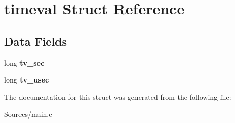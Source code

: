 \hypertarget{structtimeval}{}\section{timeval Struct Reference}
\label{structtimeval}
\subsection*{Data Fields}
\begin{DoxyCompactItemize}
\item 
long {\bfseries tv\+\_\+sec}\hypertarget{structtimeval_ad7ba4ed1f2602412d3b21ab19720fbb2}{}\label{structtimeval_ad7ba4ed1f2602412d3b21ab19720fbb2}

\item 
long {\bfseries tv\+\_\+usec}\hypertarget{structtimeval_ae2b525ea8a77dac853f2e78587b40fce}{}\label{structtimeval_ae2b525ea8a77dac853f2e78587b40fce}

\end{DoxyCompactItemize}


The documentation for this struct was generated from the following file\+:\begin{DoxyCompactItemize}
\item 
Sources/main.\+c\end{DoxyCompactItemize}
